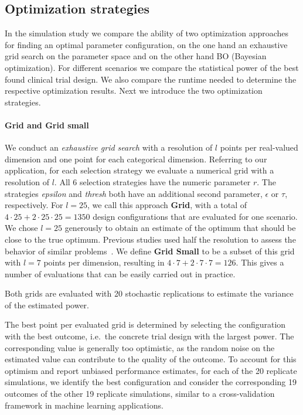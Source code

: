 \documentclass[bimj,fleqn]{w-art}
\theoremstyle{plain}
\theoremstyle{definition}
\begin{document}
\subsection{Optimization strategies}

In the simulation study we compare the ability of two optimization approaches for finding an optimal parameter configuration, on the one hand an exhaustive grid search on the parameter space and on the other hand BO (Bayesian optimization).
For different scenarios we compare the statistical power of the best found clinical trial design.
We also compare the runtime needed to determine the respective optimization results.
Next we introduce the two optimization strategies.

\paragraph{Grid and Grid small}
We conduct an \emph{exhaustive grid search} with a resolution of $l$ points per real-valued dimension and one point for each categorical dimension.
Referring to our application, for each selection strategy we evaluate a numerical grid with a resolution of $l$.
All 6 selection strategies have the numeric parameter $r$.
The strategies \emph{epsilon} and \emph{thresh} both have an additional second parameter, $\epsilon$ or $\tau$, respectively.
For $l=25$, we call this approach \textbf{Grid},
with a total of $4 \cdot 25 + 2 \cdot 25 \cdot 25 = 1350$ design configurations that are evaluated for one scenario.
We chose $l=25$ generously to obtain an estimate of the optimum that should be close to the true optimum.
Previous studies used half the resolution to assess the behavior of similar problems~\citep{friede_adaptive_2020}.
We define \textbf{Grid Small} to be a subset of this grid with $l=7$ points per dimension, resulting in $4 \cdot 7 + 2 \cdot 7 \cdot 7 = 126$.
This gives a number of evaluations that can be easily carried out in practice.

Both grids are evaluated with 20 stochastic replications to estimate the variance of the estimated power.

The best point per evaluated grid is determined by selecting the configuration with the best outcome, i.e.\ the concrete trial design with the largest power.
The corresponding value is generally too optimistic, as the random noise on the estimated value can contribute to the quality of the outcome.
To account for this optimism and report unbiased performance estimates, for each of the 20 replicate simulations, we identify the best configuration and consider the corresponding 19 outcomes of the other 19 replicate simulations, similar to a cross-validation framework in machine learning applications. 
\end{document}
